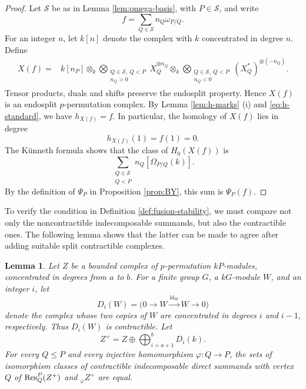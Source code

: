 \documentclass[preprint,12pt,3p]{elsarticle}
\newtheorem{lemma}[theorem]{Lemma}
\def\Res{{\rm Res}}
\begin{document}
\begin{proof}
Let $\mathscr{S}$ be as in Lemma \ref{lem:omega-basis}, with $P\in \mathscr{S}$, and write
$$
 f=\sum_{Q\in\mathscr{S}}n_Q\omega_{P/Q}.
$$
For an integer $n$, let $k[n]$ denote the complex with $k$ concentrated in degree $n$. Define
$$
 \begin{aligned}
 X(f)={}&k[n_P]
 \otimes_k
 \bigotimes_{\substack{Q\in\mathscr{S},\ Q<P\\n_Q>0}}
 X_Q^{\otimes n_Q}
 \otimes_k
 \bigotimes_{\substack{Q\in\mathscr{S},\ Q<P\\n_Q<0}}
 (X_Q^*)^{\otimes(-n_Q)}.
 \end{aligned}
$$
Tensor products, duals and shifts preserve the endosplit property.  Hence $X(f)$ is an endosplit $p$-permutation complex.  By Lemma \ref{lem:h-marks} (i) and \eqref{eq:h-standard}, we have $h_{X(f)}=f$.  In particular, the homology of $X(f)$ lies in degree
$$
 h_{X(f)}(1)=f(1)=0.
$$
The K\"unneth formula shows that the class of $H_0(X(f))$ is
$$
 \sum_{\substack{Q\in\mathscr{S}\\Q<P}}
  n_Q[\Omega_{P/Q}(k)].
$$
By the definition of $\Psi_P$ in Proposition \ref{prop:BY}, this sum is $\Psi_P(f)$.
\end{proof}

To verify the condition in Definition \ref{def:fusion-stability}, we must compare not only the noncontractible indecomposable summands, but also the contractible ones.  The following lemma shows that the latter can be made to agree after adding suitable split contractible complexes.

\begin{lemma}\label{lem:contractible-padding}
Let $Z$ be a bounded complex of $p$-permutation $kP$-modules, concentrated in degrees from $a$ to $b$. For a finite group $G$, a $kG$-module $W$, and an integer $i$, let
$$
 D_i(W)=\big(0\longrightarrow W\xrightarrow{\operatorname{id}_W}W\longrightarrow0\big)
$$
denote the complex whose two copies of $W$ are concentrated in degrees $i$ and $i-1$, respectively.  Thus $D_i(W)$ is contractible.  Let
$$
 Z^+=Z\oplus\bigoplus_{i=a+1}^{b}D_i(k).
$$
For every $Q\leq P$ and every injective homomorphism $\varphi:Q\to P$, the sets of isomorphism classes of contractible indecomposable direct summands with vertex $Q$ of $\Res_Q^P(Z^+)$ and ${}_\varphi Z^+$ are equal.
\end{lemma}
\end{document}
